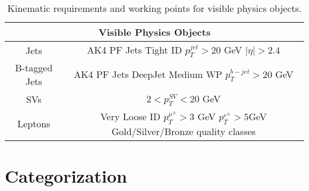 \begin{table}
\centering
\caption{Kinematic requirements and working points for visible physics objects.}
\begin{tabular}{c|c}
\hline 
\multicolumn{2}{c}{Visible Physics Objects} \\ 
\hline 
\hline
Jets & \makecell{AK4 PF Jets \\ Tight ID \\ $p_T^{jet} > 20$ GeV \\ $|\eta|>2.4$} \\ 
\hline
B-tagged Jets & \makecell{AK4 PF Jets \\ DeepJet Medium WP \\ $p_T^{b-jet} > 20 $ GeV}  \\ 
\hline
SVs & $2<p_T^{SV}<20$ GeV \\ 
\hline
Leptons & \makecell{Very Loose ID \\ $p_T^{\mu^\pm} > 3$ GeV \\ $p_T^{e^\pm} > 5 $GeV \\ Gold/Silver/Bronze quality classes} \\ 
\hline 
\end{tabular} 
\label{tab:physicsobjects}
\end{table}

\section{Categorization}

